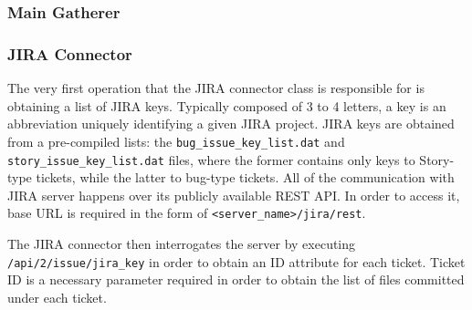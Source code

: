 \subsubsection{Main Gatherer}\label{sec:source-code:main-gatherer}

\subsubsection{JIRA Connector}\label{sec:source-code:jira}
The very first operation that the JIRA connector class is responsible for is obtaining a list of JIRA keys. Typically composed of 3 to 4 letters, a key is an abbreviation uniquely identifying a given JIRA project. JIRA keys are obtained from a pre-compiled lists: the \texttt{bug\_issue\_key\_list.dat} and \texttt{story\_issue\_key\_list.dat} files, where the former contains only keys to Story-type tickets, while the latter to bug-type tickets. 
All of the communication with JIRA server happens over its publicly available REST API. In order to access it, base URL is required in the form of \texttt{<server_name>/jira/rest}.

The JIRA connector then interrogates the server by executing \texttt{/api/2/issue/{jira_key}} in order to obtain an ID attribute for each ticket. Ticket ID is a necessary parameter required in order to obtain the list of files committed under each ticket.

